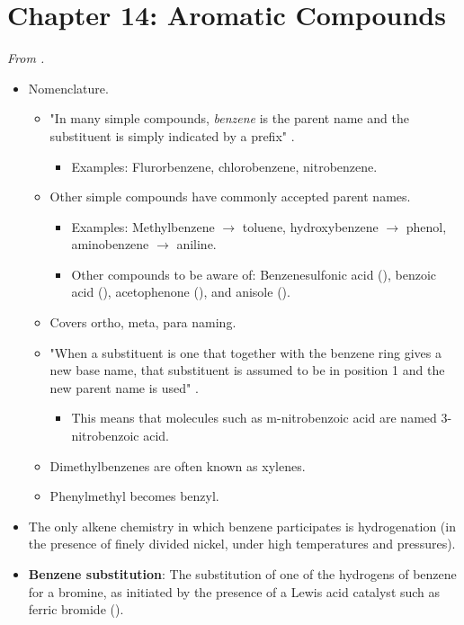\documentclass[../notes.tex]{subfiles}
\begin{document}
\section{Chapter 14: Aromatic Compounds}
\emph{From \textcite{bib:SolomonsEtAl}.}
\begin{itemize}
    \item {}Nomenclature.
    \begin{itemize}
        \item "In many simple compounds, \emph{benzene} is the parent name and the substituent is simply indicated by a prefix" \parencite[619]{bib:SolomonsEtAl}.
        \begin{itemize}
            \item Examples: Flurorbenzene, chlorobenzene, nitrobenzene.
        \end{itemize}
        \item Other simple compounds have commonly accepted parent names.
        \begin{itemize}
            \item Examples: Methylbenzene $\to$ toluene, hydroxybenzene $\to$ phenol, aminobenzene $\to$ aniline.
            \item Other compounds to be aware of: Benzenesulfonic acid (), benzoic acid (), acetophenone (), and anisole ().
        \end{itemize}
        \item Covers ortho, meta, para naming.
        \item "When a substituent is one that together with the benzene ring gives a new base name, that substituent is assumed to be in position 1 and the new parent name is used" \parencite[620]{bib:SolomonsEtAl}.
        \begin{itemize}
            \item This means that molecules such as m-nitrobenzoic acid are named 3-nitrobenzoic acid.
        \end{itemize}
        \item Dimethylbenzenes are often known as xylenes.
        \item Phenylmethyl becomes benzyl.
    \end{itemize}
    \item The only alkene chemistry in which benzene participates is hydrogenation (in the presence of finely divided nickel, under high temperatures and pressures).
    \item \textbf{Benzene substitution}: The substitution of one of the hydrogens of benzene for a bromine, as initiated by the presence of a Lewis acid catalyst such as ferric bromide ().

\end{itemize}
\end{document}
